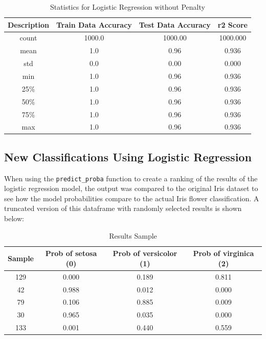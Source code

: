 \documentclass[journal]{IEEEtran}
\begin{document}
\begin{table}[h!]
\centering
\begin{tabular}{ c | c c c }
    Description & Train Data Accuracy & Test Data Accuracy & r2 Score \\
\hline
count      &         1000.0     &        1000.00 & 1000.000\\
mean       &            1.0      &          0.96 &    0.936\\
std        &            0.0      &          0.00 &    0.000\\
min        &            1.0      &          0.96 &    0.936\\
25\%       &             1.0     &           0.96 &    0.936\\
50\%       &             1.0     &           0.96 &    0.936\\
75\%        &            1.0     &           0.96 &    0.936\\
max        &            1.0      &          0.96  &   0.936\\
\end{tabular}
\caption{Statistics for Logistic Regression without Penalty}
\label{table:logRegL2}
\end{table}

    

\subsection{New Classifications Using Logistic Regression}
When using the \lstinline{predict_proba} function to create a ranking of the results of the logistic regression model, the output was compared to the original Iris dataset to see how the model probabilities compare to the actual Iris flower classification. A truncated version of this dataframe with randomly selected results is shown below:

\begin{table}[h!]
\centering
\begin{tabular}{ c | c c c }
Sample & Prob of setosa (0) &	Prob of versicolor (1) & Prob of virginica (2) \\ 
\hline
129	& 0.000	& 0.189	& 0.811 \\
42	& 0.988	& 0.012	& 0.000 \\
79	& 0.106	& 0.885	& 0.009 \\
30	& 0.965	& 0.035	& 0.000 \\
133	& 0.001	& 0.440	& 0.559
\end{tabular}
\caption{Results Sample}
\label{table:model-comparison-table}
\end{table}
\end{document}
